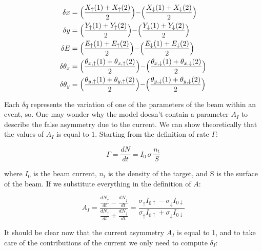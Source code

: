 \begin{equation}
\begin{split}
\delta {x} & = \Bigl(\dfrac{X_{\uparrow}(1) + X_{\uparrow}(2)}{2}\Bigl)  - \Bigl(\dfrac{X_{\downarrow}(1) + X_{\downarrow}(2)}{2}\Bigl)\\
\delta {y} & = \Bigl(\dfrac{Y_{\uparrow}(1) + Y_{\uparrow}(2)}{2}\Bigl)  - \Bigl(\dfrac{Y_{\downarrow}(1) + Y_{\downarrow}(2)}{2}\Bigl)\\
\delta {E} & = \Bigl(\dfrac{E_{\uparrow}(1) + E_{\uparrow}(2)}{2}\Bigl)  - \Bigl(\dfrac{E_{\downarrow}(1) + E_{\downarrow}(2)}{2}\Bigl)\\
\delta {\theta_{x}} & = \Bigl( \dfrac{\theta_{x,\uparrow}(1) + \theta_{x,\uparrow}(2)}{2} \Bigl) - \Bigl(\dfrac{\theta_{x,\downarrow}(1) + \theta_{x,\downarrow}(2)}{2} \Bigl)\\
\delta {\theta_{y}} & = \Bigl( \dfrac{\theta_{y,\uparrow}(1) + \theta_{y,\uparrow}(2)}{2} \Bigl) - \Bigl(\dfrac{\theta_{y,\downarrow}(1) + \theta_{y,\downarrow}(2)}{2} \Bigl)\\ 
\end{split}
\end{equation}

Each $\delta q$ represents the variation of one of the parameters of the beam within an event, so.
One may wonder why the model doesn't contain a parameter $A_{I}$ to describe the false asymmetry due to the current. We can show theoretically that the values of $A_{I}$ is equal to $1$. Starting from the definition of rate $\Gamma$:

\begin{equation}
\Gamma = \frac{dN}{dt} = I_{0} \, \sigma \, \frac{n_{t}}{S}
\end{equation}

where $I_{0}$ is the beam current, $n_{t}$ is the density of the target, and S is the surface of the beam. If we substitute everything in the definition of $A$:

\begin{equation}
A_{I} = \dfrac{\frac{dN_{\uparrow}}{dt} - \frac{dN_{\downarrow}}{dt}}{\frac{dN_{\uparrow}}{dt} + \frac{dN_{\downarrow}}{dt}} = \dfrac{\sigma_{\uparrow} I_{0 \uparrow} - \sigma_{\downarrow} I_{0 \downarrow}}{\sigma_{\uparrow} I_{0 \uparrow} + \sigma_{\downarrow} I_{0 \downarrow}}
\end{equation}

It should be clear now that the current asymmetry $A_{I}$ is equal to 1, and to take care of the contributions of the current we only need to compute $\delta_{I}$: 

